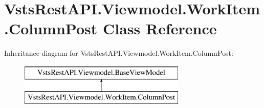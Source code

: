 \hypertarget{class_vsts_rest_a_p_i_1_1_viewmodel_1_1_work_item_1_1_column_post}{}\section{Vsts\+Rest\+A\+P\+I.\+Viewmodel.\+Work\+Item.\+Column\+Post Class Reference}
\label{class_vsts_rest_a_p_i_1_1_viewmodel_1_1_work_item_1_1_column_post}
Inheritance diagram for Vsts\+Rest\+A\+P\+I.\+Viewmodel.\+Work\+Item.\+Column\+Post\+:\begin{figure}[H]
\begin{center}
\leavevmode
\includegraphics[height=2.000000cm]{class_vsts_rest_a_p_i_1_1_viewmodel_1_1_work_item_1_1_column_post}
\end{center}
\end{figure}
